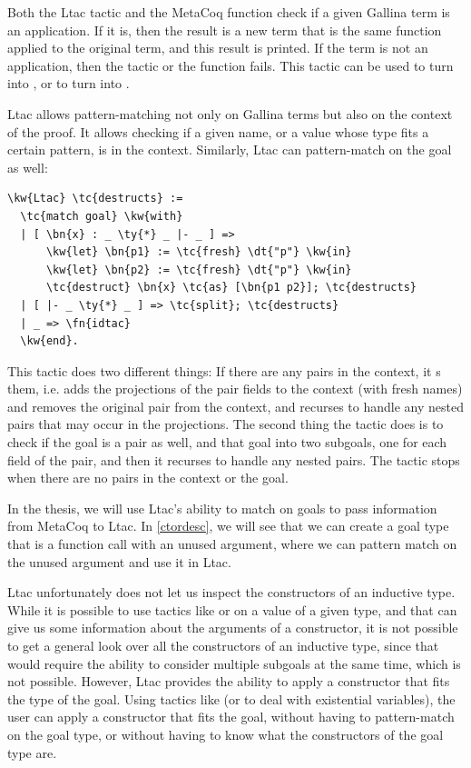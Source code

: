Both the \gls{Ltac} tactic and the MetaCoq function check if a given \gls{Gallina} term is an application. If it is, then the result is a new term that is the same function applied to the original term, and this result is printed. If the term is not an application, then the tactic or the function fails. This tactic can be used to turn  into , or to turn  into .

\gls{Ltac} allows pattern-matching not only on \gls{Gallina} terms but also on the context of the proof. It allows checking if a given name, or a value whose type fits a certain pattern, is in the context. Similarly, \gls{Ltac} can pattern-match on the goal as well:

\begin{Verbatim}
\kw{Ltac} \tc{destructs} :=
  \tc{match goal} \kw{with}
  | [ \bn{x} : _ \ty{*} _ |- _ ] =>
      \kw{let} \bn{p1} := \tc{fresh} \dt{"p"} \kw{in}
      \kw{let} \bn{p2} := \tc{fresh} \dt{"p"} \kw{in}
      \tc{destruct} \bn{x} \tc{as} [\bn{p1 p2}]; \tc{destructs}
  | [ |- _ \ty{*} _ ] => \tc{split}; \tc{destructs}
  | _ => \fn{idtac}
  \kw{end}.
\end{Verbatim}

This tactic does two different things: If there are any pairs in the context, it s them, i.e. adds the projections of the pair fields to the context (with fresh names) and removes the original pair from the context, and recurses to handle any nested pairs that may occur in the projections. The second thing the tactic does is to check if the goal is a pair as well, and  that goal into two subgoals, one for each field of the pair, and then it recurses to handle any nested pairs. The tactic stops when there are no pairs in the context or the goal.

In the thesis, we will use \gls{Ltac}'s ability to match on goals to pass information from MetaCoq to \gls{Ltac}. In \autoref{ctordesc}, we will see that we can create a goal type that is a function call with an unused argument, where we can pattern match on the unused argument and use it in \gls{Ltac}.

\gls{Ltac} unfortunately does not let us inspect the constructors of an inductive type. While it is possible to use tactics like  or  on a value of a given type, and that can give us some information about the arguments of a constructor, it is not possible to get a general look over all the constructors of an inductive type, since that would require the ability to consider multiple subgoals at the same time, which is not possible. However, \gls{Ltac} provides the ability to apply a constructor that fits the type of the goal. Using tactics like  (or  to deal with existential variables), the user can apply a constructor that fits the goal, without having to pattern-match on the goal type, or without having to know what the constructors of the goal type are.

